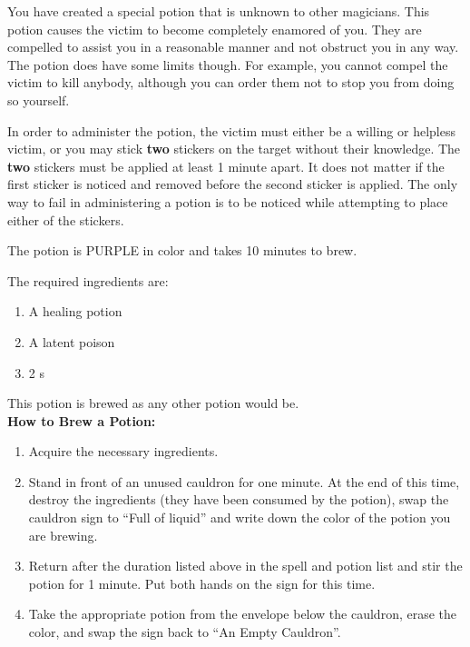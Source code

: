 \documentclass[green]{NeptuneBall}
\begin{document}
\name{\gLove{}}

You have created a special potion that is unknown to other magicians. This potion causes the victim to become completely enamored of you. They are compelled to assist you in a reasonable manner and not obstruct you in any way. The potion does have some limits though. For example, you cannot compel the victim to kill anybody, although you can order them not to stop you from doing so yourself.

In order to administer the potion, the victim must either be a willing or helpless victim, or you may stick {\bf two} stickers on the target without their knowledge. The {\bf two} stickers must be applied at least 1 minute apart. It does not matter if the first sticker is noticed and removed before the second sticker is applied. The only way to fail in administering a potion is to be noticed while attempting to place either of the stickers.

The potion is PURPLE in color and takes 10 minutes to brew.

The required ingredients are:
\begin{enumerate}
\item A healing potion 
\item A latent poison
\item 2 \iPearl{}s
\end{enumerate}

This potion is brewed as any other potion would be.\\

{\bf How to Brew a Potion:}\\ %
\begin{enumerate}
  \item Acquire the necessary ingredients.
  \item Stand in front of an unused cauldron for one minute. At the end of this time, destroy the ingredients (they have been consumed by the potion), swap the cauldron sign to ``Full of liquid'' and write down the color of the potion you are brewing.
  \item Return after the duration listed above in the spell and potion list and stir the potion for 1 minute. Put both hands on the sign for this time.
  \item Take the appropriate potion from the envelope below the cauldron, erase the color, and swap the sign back to ``An Empty Cauldron''.
\end{enumerate}
\end{document}
